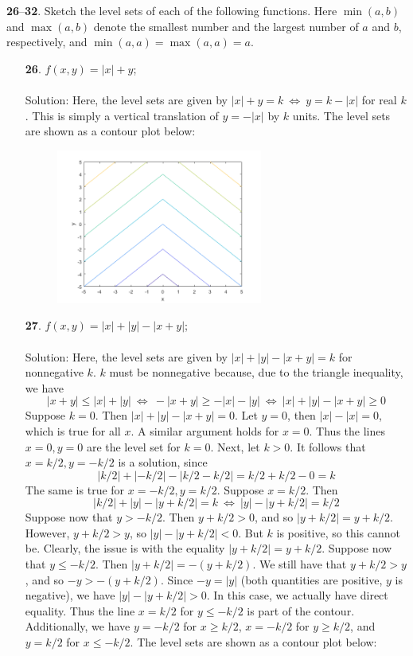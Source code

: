 \documentclass[12pt]{amsbook}
\begin{document}
\noindent
{\small {\bf 26}--{\bf 32}}. Sketch the level sets of each of the following functions. Here
$\operatorname{min}(a, b)$ and $\operatorname{max}(a, b)$ denote the smallest number and the largest number
of $a$ and $b$, respectively, and $\operatorname{min}(a, a)=\operatorname{max}(a, a)=a$.
\begin{enumerate}
  \item[{\small\bf 26}.] $f(x,y)=|x|+y$;
  \\
  \\
  {\sc Solution}: Here, the level sets are given by $|x|+y=k \ \Leftrightarrow \ y=k-|x|$ for real $k$. This is simply a vertical translation of $y=-|x|$ by $k$ units. The level sets are shown as a contour plot below:
  \begin{center}
  \includegraphics[width=3.5in,height=2.0in]{3_1_26.png}
  \end{center}
  \item[{\small\bf 27}.] $f(x,y)=|x|+|y|-|x+y|$;
  \\
  \\
  {\sc Solution}: Here, the level sets are given by $|x|+|y|-|x+y|=k$ for nonnegative $k$. $k$ must be nonnegative because, due to the triangle inequality, we have
  $$|x+y|\leq |x|+|y| \ \Leftrightarrow \ -|x+y|\geq-|x|-|y| \ \Leftrightarrow \ |x|+|y|-|x+y| \geq 0$$
   Suppose $k=0$. Then $|x|+|y|-|x+y|=0$. Let $y=0$, then $|x|-|x|=0$, which is true for all $x$. A similar argument holds for $x=0$. Thus the lines $x=0,y=0$ are the level set for $k=0$. Next, let $k>0$. It follows that $x=k/2,y=-k/2$ is a solution, since
   $$|k/2|+|-k/2|-|k/2-k/2|=k/2+k/2-0=k$$
   The same is true for $x=-k/2,y=k/2$. Suppose $x=k/2$. Then 
   $$|k/2|+|y|-|y+k/2|=k \ \Leftrightarrow \ |y|-|y+k/2|=k/2$$
   Suppose now that $y> -k/2$. Then $y+k/2>0$, and so $|y+k/2|=y+k/2$. However, $y+k/2>y$, so $|y|-|y+k/2|<0$. But $k$ is positive, so this cannot be. Clearly, the issue is with the equality $|y+k/2|=y+k/2$. Suppose now that $y \leq -k/2$. Then $|y+k/2|=-(y+k/2)$. We still have that $y+k/2>y$, and so $-y>-(y+k/2)$. Since $-y=|y|$ (both quantities are positive, $y$ is negative), we have $|y|-|y+k/2|>0$. In this case, we actually have direct equality. Thus the line $x=k/2$ for $y\leq -k/2$ is part of the contour. Additionally, we have $y=-k/2$ for $x \geq k/2$, $x=-k/2$ for $y \geq k/2$, and $y=k/2$ for $x \leq -k/2$. The level sets are shown as a contour plot below:

\end{enumerate}
\end{document}
